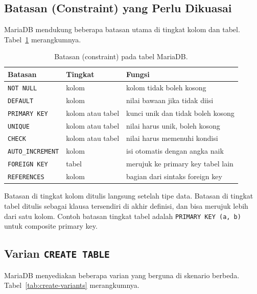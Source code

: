 \documentclass[11pt,a4paper]{article}
\begin{document}
\subsection{Batasan (Constraint) yang Perlu Dikuasai}

MariaDB mendukung beberapa batasan utama di tingkat kolom dan tabel. Tabel~\ref{tab:constraints} merangkumnya.

\begin{table}[H]
	\centering
	\caption{Batasan (constraint) pada tabel MariaDB.}
	\label{tab:constraints}
	\small
	\begin{tabularx}{\textwidth}{l l X}
		\toprule
		Batasan                  & Tingkat          & Fungsi                            \\
		\midrule
		\texttt{NOT NULL}        & kolom            & kolom tidak boleh kosong          \\
		\texttt{DEFAULT}         & kolom            & nilai bawaan jika tidak diisi     \\
		\texttt{PRIMARY KEY}     & kolom atau tabel & kunci unik dan tidak boleh kosong \\
		\texttt{UNIQUE}          & kolom atau tabel & nilai harus unik, boleh kosong    \\
		\texttt{CHECK}           & kolom atau tabel & nilai harus memenuhi kondisi      \\
		\texttt{AUTO\_INCREMENT} & kolom            & isi otomatis dengan angka naik    \\
		\texttt{FOREIGN KEY}     & tabel            & merujuk ke primary key tabel lain \\
		\texttt{REFERENCES}      & kolom            & bagian dari sintaks foreign key   \\
		\bottomrule
	\end{tabularx}
\end{table}

Batasan di tingkat kolom ditulis langsung setelah tipe data. Batasan di tingkat tabel ditulis sebagai klausa tersendiri di akhir definisi, dan bisa merujuk lebih dari satu kolom. Contoh batasan tingkat tabel adalah \texttt{PRIMARY KEY (a, b)} untuk composite primary key.

\subsection{Varian \texttt{CREATE TABLE}}

MariaDB menyediakan beberapa varian yang berguna di skenario berbeda. Tabel~\ref{tab:create-variants} merangkumnya.
\end{document}
